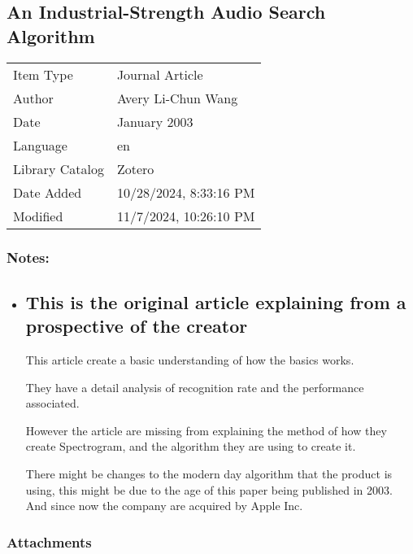 \documentclass[twoside]{report}
\begin{document}
\begin{itemize}
  \subsection{An Industrial-Strength Audio Search
  Algorithm}\label{an-industrial-strength-audio-search-algorithm}

  \begin{longtable}[]{@{}ll@{}}
  \toprule\noalign{}
  \endhead
  \bottomrule\noalign{}
  \endlastfoot
  Item Type & Journal Article \\
  Author & Avery Li-Chun Wang \\
  Date & January 2003 \\
  Language & en \\
  Library Catalog & Zotero \\
  Date Added & 10/28/2024, 8:33:16 PM \\
  Modified & 11/7/2024, 10:26:10 PM \\
  \end{longtable}

  \subsubsection{Notes:}\label{notes-1}

  \begin{itemize}
  \item
    \label{item_4C2M86CP}
    \section{This is the original article explaining from a prospective
    of the
    creator}\label{this-is-the-original-article-explaining-from-a-prospective-of-the-creator}

    This article create a basic understanding of how the basics works.

    They have a detail analysis of recognition rate and the performance
    associated.

    However the article are missing from explaining the method of how
    they create Spectrogram, and the algorithm they are using to create
    it.

    There might be changes to the modern day algorithm that the product
    is using, this might be due to the age of this paper being published
    in 2003. And since now the company are acquired by Apple Inc.
  \end{itemize}

  \subsubsection{Attachments}\label{attachments-1}


\end{itemize}
\end{document}
